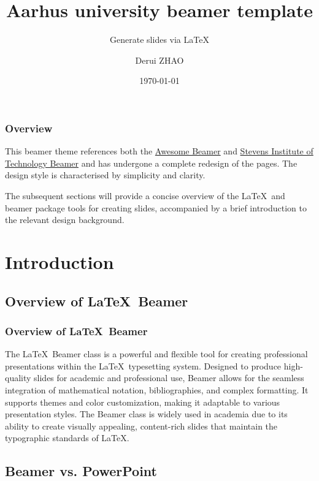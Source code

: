 \documentclass[aspectratio=1610]{beamer}
\title{Aarhus university beamer template}
\subtitle{Generate slides via \LaTeX}
\author{Derui ZHAO}
\date{\today}
\begin{document}
\frame{\titlepage}

\begin{frame}
    \frametitle{Overview}
    This beamer theme references both the \href{https://github.com/LukasPietzschmann/awesome-beamer}{Awesome Beamer} and \href{https://github.com/ProofLabs/StevensBeamerLatexTemplate}{Stevens Institute of Technology Beamer} and has undergone a complete redesign of the pages. The design style is characterised by simplicity and clarity.

    The subsequent sections will provide a concise overview of the \LaTeX\ and beamer package tools for creating slides, accompanied by a brief introduction to the relevant design background.
\end{frame}

\section{Introduction}

\subsection{Overview of \LaTeX\ Beamer}

\begin{frame}
    \frametitle{Overview of \LaTeX\ Beamer}
    The \LaTeX\ Beamer class is a powerful and flexible tool for creating professional presentations within the \LaTeX\ typesetting system. Designed to produce high-quality slides for academic and professional use, Beamer allows for the seamless integration of mathematical notation, bibliographies, and complex formatting. It supports themes and color customization, making it adaptable to various presentation styles. The Beamer class is widely used in academia due to its ability to create visually appealing, content-rich slides that maintain the typographic standards of \LaTeX.
\end{frame}

\subsection{Beamer vs. PowerPoint}
\end{document}
